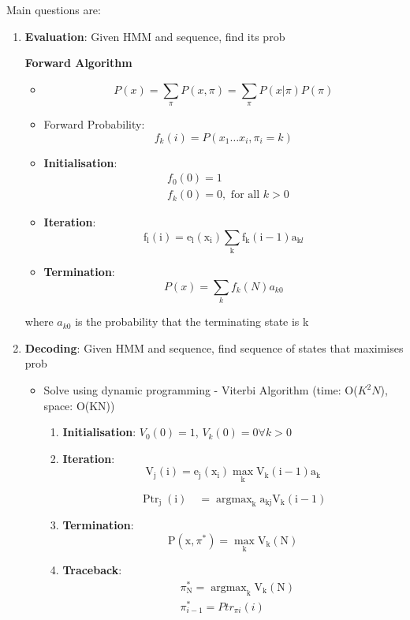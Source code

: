 \documentclass{article}
\begin{document}
Main questions are:
\begin{enumerate}
    \item \textbf{Evaluation}: Given HMM and sequence, find its prob
    
    \textbf{Forward Algorithm}
    \begin{itemize}
        \item $$
P(x)=\sum_{\pi} P(x, \pi)=\sum_{\pi} P(x | \pi) P(\pi)
$$

        \item Forward Probability: $$
f_{k}(i)=P\left(x_{1} \ldots x_{i}, \pi_{i}=k\right)
$$

        \item \textbf{Initialisation}: $$
\begin{aligned}
&f_{0}(0)=1\\
&f_{k}(0)=0, \text { for all } k>0
\end{aligned}
$$

        \item \textbf{Iteration}:
        $$
\mathrm{f}_{\mathrm{l}}(\mathrm{i})=\mathrm{e}_{\mathrm{l}}\left(\mathrm{x}_{\mathrm{i}}\right) \sum_{\mathrm{k}} \mathrm{f}_{\mathrm{k}}(\mathrm{i}-1) \mathrm{a}_{\mathrm{k}l}
$$

        \item \textbf{Termination}:
        $$
P(x)=\sum_{k} f_{k}(N) a_{k 0}
$$
    \end{itemize}
    
    where $a_{k0}$ is the probability that the terminating state is k
    \item \textbf{Decoding}: Given HMM and sequence, find sequence of states that maximises prob
    \begin{itemize}
        \item Solve using dynamic programming - Viterbi Algorithm (time: O($K^2N$), space: O(KN))
        \begin{enumerate}
            \item \textbf{Initialisation}: $V_0(0) = 1$, $V_k(0) = 0 \forall k > 0$
            \item \textbf{Iteration}:
            $$
\mathrm{V}_{\mathrm{j}}(\mathrm{i})=\mathrm{e}_{\mathrm{j}}\left(\mathrm{x}_{\mathrm{i}}\right) \max _{\mathrm{k}} \mathrm{V}_{\mathrm{k}}(\mathrm{i}-1) \mathrm{a}_{\mathrm{k}}
$$

$$
\operatorname{Ptr}_{\mathrm{j}}(\mathrm{i}) \quad=\operatorname{argmax}_{\mathrm{k}} \mathrm{a}_{\mathrm{kj}} \mathrm{V}_{\mathrm{k}}(\mathrm{i}-1)
$$
            \item \textbf{Termination}:
            $$
\mathrm{P}\left(\mathrm{x}, \pi^{*}\right)=\max _{\mathrm{k}} \mathrm{V}_{\mathrm{k}}(\mathrm{N})
$$
            \item \textbf{Traceback}:
            $$
\begin{aligned}
&\pi_{\mathrm{N}}^{*}=\operatorname{argmax}_{\mathrm{k}} \mathrm{V}_{\mathrm{k}}(\mathrm{N})\\
&\pi_{i-1}^{*}=P t r_{\pi i}(i)
\end{aligned}
$$



\end{enumerate}
\end{itemize}
\end{enumerate}
\end{document}
